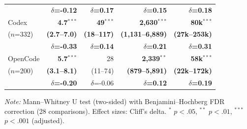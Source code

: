 \begin{table}[t]
\begin{tabular}{lrrrr}
 & \textbf{$\delta$=-0.12} & \textbf{$\delta$=0.17} & \textbf{$\delta$=0.15} & \textbf{$\delta$=0.18} \\
\addlinespace
Codex & \textbf{4.7$^{***}$} & \textbf{49$^{***}$} & \textbf{2,630$^{***}$} & \textbf{80k$^{***}$} \\
($n$=332) & \textbf{(2.7--7.0)} & \textbf{(18--117)} & \textbf{(1,131--6,889)} & \textbf{(27k--253k)} \\
 & \textbf{$\delta$=-0.33} & \textbf{$\delta$=0.14} & \textbf{$\delta$=0.21} & \textbf{$\delta$=0.31} \\
\addlinespace
OpenCode & \textbf{5.7$^{***}$} & 28 & \textbf{2,339$^{**}$} & \textbf{58k$^{***}$} \\
($n$=200) & \textbf{(3.1--8.1)} & (11--74) & \textbf{(879--5,891)} & \textbf{(22k--172k)} \\
 & \textbf{$\delta$=-0.20} & $\delta$=-0.06 & \textbf{$\delta$=0.12} & \textbf{$\delta$=0.19} \\
\bottomrule
\end{tabular}
\vspace{2pt}
\begin{minipage}{\columnwidth}
\footnotesize
\textit{Note:} Mann--Whitney U test (two-sided) with Benjamini--Hochberg FDR correction (28 comparisons). Effect sizes: Cliff's delta. $^{*}$ $p<.05$, $^{**}$ $p<.01$, $^{***}$ $p<.001$ (adjusted).
\end{minipage}
\end{table}
